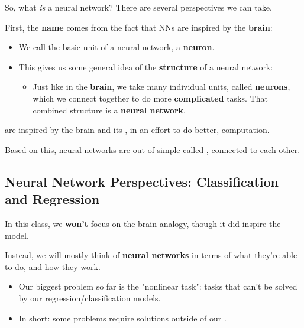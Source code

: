         So, what \textit{is} a neural network? There are several perspectives we can take.
        
        First, the \textbf{name} comes from the fact that NNs are inspired by the \textbf{brain}: 
        
        \begin{itemize}
            \item We call the basic unit of a neural network, a \textbf{neuron}.

            \item This gives us some general idea of the \textbf{structure} of a neural network:
                \begin{itemize}
                    \item Just like in the \textbf{brain}, we take many individual units, called \textbf{neurons}, which we connect together to do more \textbf{complicated} tasks. That combined structure is a \textbf{neural network}.
                        \\
                \end{itemize}
        \end{itemize}
        
        
        \begin{concept}
             are inspired by the brain and its , in an effort to do better,  computation.
            
            Based on this, neural networks are  out of simple  called , connected to each other.
        \end{concept}

        
    \subsection{Neural Network Perspectives: Classification and Regression}
    
        In this class, we \textbf{won't} focus on the brain analogy, though it did inspire the model.
        
        Instead, we will mostly think of \textbf{neural networks} in terms of what they're able to do, and how they work.

        \begin{itemize}
            \item Our biggest problem so far is the "nonlinear task": tasks that can't be solved by our  regression/classification models.

            \item In short: some problems require solutions outside of our .
        \end{itemize}

